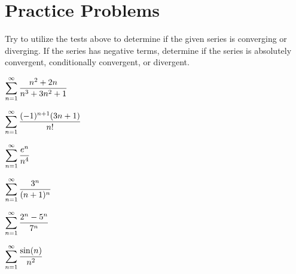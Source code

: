 \documentclass{ximera}
\theoremstyle{definition}
\newcommand{\dsum}{\displaystyle \sum}
\newcommand{\dsumone}{\dsum_{n=1}^{\infty}}
\begin{document}
\newpage

\section*{Practice Problems} Try to utilize the tests above to determine if the given series is converging or diverging. If the series has negative terms, determine if the series is absolutely convergent, conditionally convergent, or divergent.

\begin{problem}
$\dsumone \df{n^2 + 2n}{n^3 + 3n^2 + 1}$
\begin{multipleChoice}
\end{multipleChoice}
\end{problem}
\begin{problem} $\dsumone \df{(-1)^{n+1}(3n+1)}{n!}$
\begin{multipleChoice}
\end{multipleChoice}
\end{problem}
\begin{problem} $\dsumone \df{e^n}{n^4}$
\begin{multipleChoice}
\end{multipleChoice}
\end{problem}
\begin{problem} $\dsumone \df{3^n}{(n+1)^n}$
\begin{multipleChoice}
\end{multipleChoice}
\end{problem}
\begin{problem}$\dsumone \df{2^n - 5^n}{7^n}$
\begin{multipleChoice}
\end{multipleChoice}
\end{problem}
\begin{problem} $\dsumone \df{\sin(n)}{n^2}$
\begin{multipleChoice}
\end{multipleChoice}
\end{problem}
\end{document}
